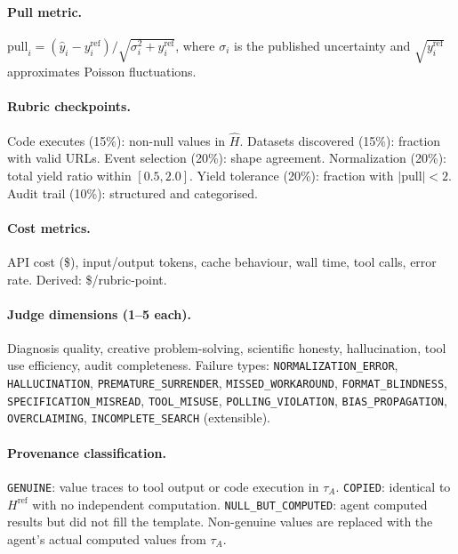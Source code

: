 \documentclass{article}
\begin{document}
\paragraph{Pull metric.}
$\mathrm{pull}_i = (\hat{y}_i - y_i^{\mathrm{ref}}) / \sqrt{\sigma_i^2 + y_i^{\mathrm{ref}}}$, where $\sigma_i$ is the published uncertainty and $\sqrt{y_i^{\mathrm{ref}}}$ approximates Poisson fluctuations.

\paragraph{Rubric checkpoints.}
Code executes (15\%): non-null values in $\hat{H}$.
Datasets discovered (15\%): fraction with valid URLs.
Event selection (20\%): shape agreement.
Normalization (20\%): total yield ratio within $[0.5, 2.0]$.
Yield tolerance (20\%): fraction with $|\mathrm{pull}| < 2$.
Audit trail (10\%): structured and categorised.

\paragraph{Cost metrics.}
API cost (\$), input/output tokens, cache behaviour, wall time, tool calls, error rate.
Derived: \$/rubric-point.

\paragraph{Judge dimensions (1--5 each).}
Diagnosis quality, creative problem-solving, scientific honesty, hallucination, tool use efficiency, audit completeness.
Failure types: \texttt{NORMALIZATION\_ERROR}, \texttt{HALLUCINATION}, \texttt{PREMATURE\_SURRENDER}, \texttt{MISSED\_WORKAROUND}, \texttt{FORMAT\_BLINDNESS}, \texttt{SPECIFICATION\_MISREAD}, \texttt{TOOL\_MISUSE}, \texttt{POLLING\_VIOLATION}, \texttt{BIAS\_PROPAGATION}, \texttt{OVERCLAIMING}, \texttt{INCOMPLETE\_SEARCH} (extensible).

\paragraph{Provenance classification.}
\texttt{GENUINE}: value traces to tool output or code execution in $\tau_A$.
\texttt{COPIED}: identical to $H^{\mathrm{ref}}$ with no independent computation.
\texttt{NULL\_BUT\_COMPUTED}: agent computed results but did not fill the template.
Non-genuine values are replaced with the agent's actual computed values from $\tau_A$.
\end{document}
